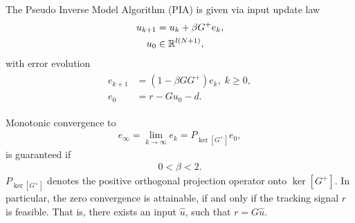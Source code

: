 \begin{alg}
	\label{alg:ILC:PIA}

	The Pseudo Inverse Model Algorithm (PIA) is given via input update law 
	\begin{align}
	\label{eq:ILD:errPIA}
	\begin{split}
	u_{k+1} &= u_k + \beta G^{+} e_k, \\
	u_0 & \in {\mathbb{R}}^{l (N+1)},
	\end{split}	
	\end{align}
	with error evolution
	\begin{align}
	\begin{split}
	e_{k+1} &= (1- \beta G G^+) e_{k}, \; k\geq 0, \\
	e_0 &= r -  Gu_0 -d.
	\end{split}
	\end{align}

	Monotonic convergence to 
	\begin{align}
	\label{eq:ILC:einfPIA} 
	e_\infty  = \lim_{k\to\infty} e_k = P_{\ker[G^+]}e_0,
	\end{align} 
	is guaranteed if
	\begin{align*}
	0 <\beta < 2.
	\end{align*}
	$P_{\ker[G^+]}$ denotes the positive orthogonal projection operator onto $\ker[G^+]$.
	In particular, the zero convergence is attainable, if and only if the tracking signal $r$ is feasible. That is, there exists an input $\hat u$, such that $r = G \hat u$. %
\end{alg}
